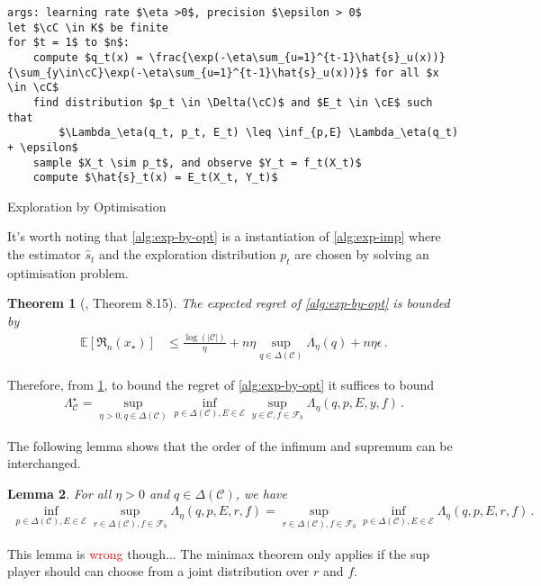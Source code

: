 \documentclass{article}
\theoremstyle{plain}
\newtheorem{theorem}{Theorem}
\newtheorem{lemma}[theorem]{Lemma}
\theoremstyle{definition}
\theoremstyle{remark}
\newcommand{\Reg}{\mathfrak{R}}
\newcommand{\E}{\mathbb E}
\newcommand{\cE}{\mathcal E}
\newcommand{\cF}{\mathcal F}
\newcommand{\cC}{\mathcal C}
\theoremstyle{definition}
\begin{document}
\begin{algorithm}[h!]
    \begin{minipage}{12cm}
        \begin{mdframed}
            \begin{lstlisting}
args: learning rate $\eta >0$, precision $\epsilon > 0$
let $\cC \in K$ be finite
for $t = 1$ to $n$:
    compute $q_t(x) = \frac{\exp(-\eta\sum_{u=1}^{t-1}\hat{s}_u(x))}{\sum_{y\in\cC}\exp(-\eta\sum_{u=1}^{t-1}\hat{s}_u(x))}$ for all $x \in \cC$
    find distribution $p_t \in \Delta(\cC)$ and $E_t \in \cE$ such that
        $\Lambda_\eta(q_t, p_t, E_t) \leq \inf_{p,E} \Lambda_\eta(q_t) + \epsilon$
    sample $X_t \sim p_t$, and observe $Y_t = f_t(X_t)$
    compute $\hat{s}_t(x) = E_t(X_t, Y_t)$
\end{lstlisting}
            \caption{Exploration by Optimisation}\label{alg:exp-by-opt}
        \end{mdframed}
    \end{minipage}
\end{algorithm}
It's worth noting that \cref{alg:exp-by-opt} is a instantiation of \cref{alg:exp-imp} where the estimator $\hat{s}_t$ and the exploration distribution $p_t$ are chosen by solving an optimisation problem.

\begin{theorem}[\cite{lattimore2024bandit}, Theorem 8.15] \label{thm:exp-by-opt-regret}
    The expected regret of \cref{alg:exp-by-opt} is bounded by
    \begin{align*}
        \E\left[
            \Reg_n(x_\star)
            \right]
         & \leq
        \frac{\log(|\cC|)}{\eta}
        +
        n\eta \sup_{q \in \Delta(\cC)} \Lambda_\eta(q) + n\eta\epsilon\,.
    \end{align*}
\end{theorem}

Therefore, from \cref{thm:exp-by-opt-regret}, to bound the regret of \cref{alg:exp-by-opt} it suffices to bound
\begin{align}
    \Lambda^\star_\cC =
    \sup_{\eta > 0, q \in \Delta(\cC)}
    \inf_{p \in \Delta(\cC), E \in \cE}
    \sup_{y \in \cC, f \in \cF_b}
    \Lambda_\eta(q, p, E, y, f)\,.
    \label{eq:exp-by-opt-saddle}
\end{align}

The following lemma shows that the order of the infimum and supremum can be interchanged.
\begin{lemma}
    \label{lem:exp-by-opt-minimax-wrong}
    For all $\eta > 0$ and $q \in \Delta(\cC)$,  we have
    \begin{align*}
        \inf_{p \in \Delta(\cC), E \in \cE}
        \sup_{r \in \Delta(\cC), f \in \cF_b}
        \Lambda_\eta(q, p, E, r, f)
        =
        \sup_{r \in \Delta(\cC), f \in \cF_b}
        \inf_{p \in \Delta(\cC), E \in \cE}
        \Lambda_\eta(q, p, E, r, f)\,.
    \end{align*}
\end{lemma}
This lemma is \textcolor{red}{wrong} though... The minimax theorem only applies if the sup player should can choose from a joint distribution over $r$ and $f$.
\end{document}
